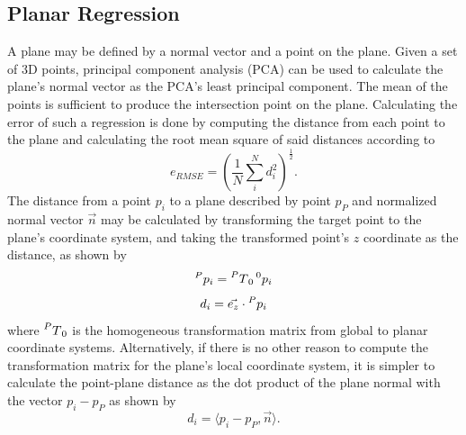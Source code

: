 \subsection{Planar Regression}\label{sec:planar_regression}
A plane may be defined by a normal vector and a point on the plane.
Given a set of 3D points, principal component analysis (PCA) can be used to calculate the plane's normal vector as the PCA's least principal component.
The mean of the points is sufficient to produce the intersection point on the plane.
Calculating the error of such a regression is done by computing the distance from each point to the plane and calculating the root mean square of said distances according to
\begin{equation*}
	e_{RMSE} = \left(\frac{1}{N}\sum_{i}^{N}d_i^2 \right)^{\frac{1}{2}}.
\end{equation*}
The distance from a point $p_i$ to a plane described by point $p_P$ and normalized normal vector $\vec{n}$ may be calculated by transforming the target point to the plane's coordinate system, and taking the transformed point's $z$ coordinate as the distance, as shown by
\begin{equation*}
	\prescript{P}{}p_i = \prescript{P}{}T_0 \prescript{0}{}p_i
\end{equation*}
\begin{equation*}
	d_i = \vec{e_z} \cdot \prescript{P}{}p_i
\end{equation*}
where $\prescript{P}{}T_0$ is the homogeneous transformation matrix from global to planar coordinate systems.
Alternatively, if there is no other reason to compute the transformation matrix for the plane's local coordinate system, it is simpler to calculate the point-plane distance as the dot product of the plane normal with the vector $p_i - p_P$ as shown by
\begin{equation*}
	d_i = \langle p_i - p_P, \vec{n}\rangle.
\end{equation*}

